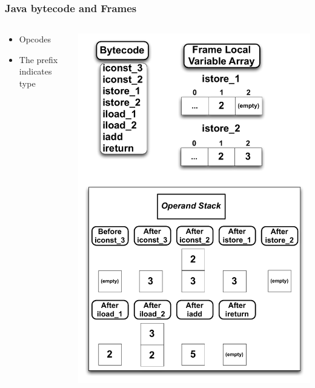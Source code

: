 \documentclass{beamer}
\begin{document}
\begin{frame}
\frametitle{Java bytecode and Frames}
\begin{columns}
\begin{column}{0.5\textwidth}
\begin{itemize}	
\item Opcodes
\item The prefix indicates type
\end{itemize}
\end{column}

\begin{column}{0.5\textwidth}
\includegraphics[height=.8\textheight]{Illustrations/stackBytecode.pdf}
\end{column}
\end{columns}
\end{frame}
\end{document}
